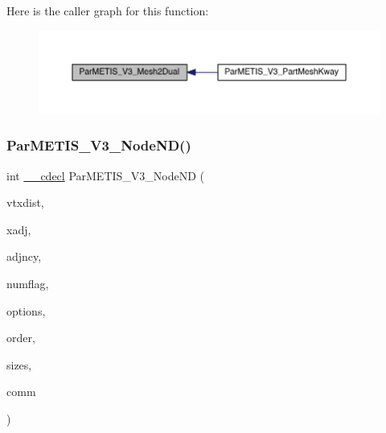 Here is the caller graph for this function\+:\nopagebreak
\begin{figure}[H]
\begin{center}
\leavevmode
\includegraphics[width=350pt]{a00840_a2f9e316d7e0c46037cf231cd82cf9d97_icgraph}
\end{center}
\end{figure}
\mbox{\label{a00840_add23df29b4f232ac4c2cca94cc083a32}} 
\subsubsection{\texorpdfstring{Par\+M\+E\+T\+I\+S\+\_\+\+V3\+\_\+\+Node\+N\+D()}{ParMETIS\_V3\_NodeND()}}
{\footnotesize\ttfamily int \hyperlink{a00843_a238347d7669f8f1e9c83bfe63a2730c4}{\+\_\+\+\_\+cdecl} Par\+M\+E\+T\+I\+S\+\_\+\+V3\+\_\+\+Node\+ND (\begin{DoxyParamCaption}\item[{\hyperlink{a00876_aaa5262be3e700770163401acb0150f52}{idx\+\_\+t} $\ast$}]{vtxdist,  }\item[{\hyperlink{a00876_aaa5262be3e700770163401acb0150f52}{idx\+\_\+t} $\ast$}]{xadj,  }\item[{\hyperlink{a00876_aaa5262be3e700770163401acb0150f52}{idx\+\_\+t} $\ast$}]{adjncy,  }\item[{\hyperlink{a00876_aaa5262be3e700770163401acb0150f52}{idx\+\_\+t} $\ast$}]{numflag,  }\item[{\hyperlink{a00876_aaa5262be3e700770163401acb0150f52}{idx\+\_\+t} $\ast$}]{options,  }\item[{\hyperlink{a00876_aaa5262be3e700770163401acb0150f52}{idx\+\_\+t} $\ast$}]{order,  }\item[{\hyperlink{a00876_aaa5262be3e700770163401acb0150f52}{idx\+\_\+t} $\ast$}]{sizes,  }\item[{M\+P\+I\+\_\+\+Comm $\ast$}]{comm }\end{DoxyParamCaption})}

